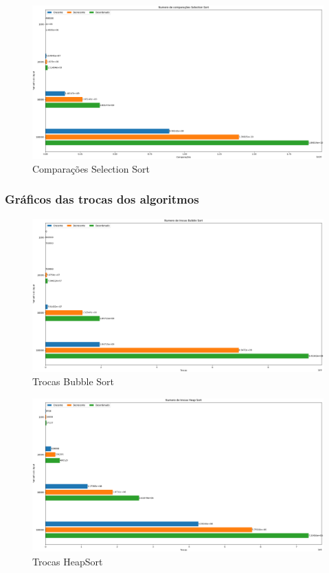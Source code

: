\documentclass[12pt,a4paper]{article}
\begin{document}
\begin{figure}[H]
    \centering
    \includegraphics[width=\textwidth]{Graficos/Comparações/Selection Sort.png}
    \caption{Comparações Selection Sort}
    \label{fig:compSelectionSort}
\end{figure}

\subsubsection{Gráficos das trocas dos algoritmos}
\begin{figure}[H]
    \centering
    \includegraphics[width=\textwidth]{Graficos/Trocas/Bubble Sort.png}
    \caption{Trocas Bubble Sort}
    \label{fig:trocasBubbleSort}
\end{figure}

\begin{figure}[H]
    \centering
    \includegraphics[width=\textwidth]{Graficos/Trocas/Heap Sort.png}
    \caption{Trocas HeapSort}
    \label{fig:trocasHeapSort}
\end{figure}
\end{document}
